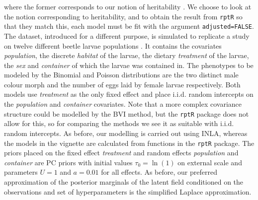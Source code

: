 where the former corresponds to our notion of heritability \citep{Stoffel2017rptR}. We choose to look at the notion corresponding to heritability, and to obtain the result from \texttt{rptR} so that they match this, each model must be fit with the argument \texttt{adjusted=FALSE}. The dataset, introduced for a different purpose, is simulated to replicate a study on twelve different beetle larvae populations \citep{Stoffel2017rptR}. It contains the covariates \textit{population}, the discrete \textit{habitat} of the larvae, the dietary \textit{treatment} of the larvae, the \textit{sex} and \textit{container} of which the larvae was contained in. The phenotypes to be modeled by the Binomial and Poisson distributions are the two distinct male colour morph and the number of eggs laid by female larvae respectively. Both models use \textit{treatment} as the only fixed effect and place i.i.d. random intercepts on the \textit{population} and \textit{container} covariates. Note that a more complex covariance structure could be modelled by the BVI method, but the \texttt{rptR} package does not allow for this, so for comparing the methods we see it as suitable with i.i.d. random intercepts. As before, our modelling is carried out using INLA, whereas the models in the vignette are calculated from functions in the \texttt{rptR} package. The priors placed on the fixed effect \textit{treatment} and random effects \textit{population} and \textit{container} are PC priors with initial values $\tau_0=\ln(1)$ on external scale and parameters $U=1$ and $a=0.01$ for all effects. As before, our preferred approximation of the posterior marginals of the latent field conditioned on the observations and set of hyperparameters is the simplified Laplace approximation.


